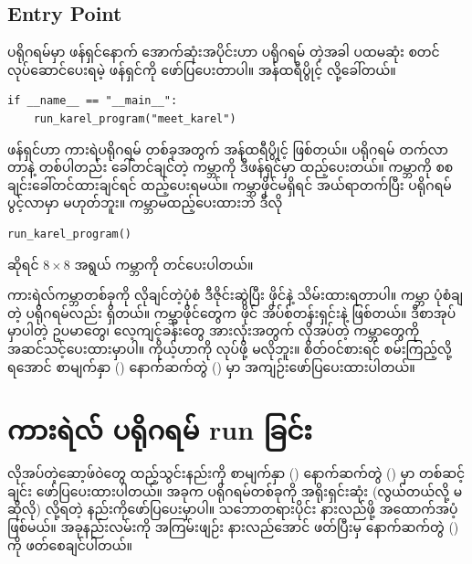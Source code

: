 \subsection*{Entry Point}
 ပရိုဂရမ်မှာ  ဖန်ရှင်နောက် အောက်ဆုံးအပိုင်းဟာ ပရိုဂရမ်  တဲ့အခါ ပထမဆုံး စတင်လုပ်ဆောင်ပေးရမဲ့ ဖန်ရှင်ကို ဖော်ပြပေးတာပါ။ အန်ထရီပွိုင့်  လို့ခေါ်တယ်။ 
%
\setlength{\fboxsep}{0pt}
\begin{verbatim}
if __name__ == "__main__":
    run_karel_program("meet_karel")
\end{verbatim}
%
 ဖန်ရှင်ဟာ ကားရဲပရိုဂရမ် တစ်ခုအတွက် အန်ထရီပွိုင့် ဖြစ်တယ်။  ပရိုဂရမ် တက်လာတာနဲ့ တစ်ပါတည်း ခေါ်တင်ချင်တဲ့ ကမ္ဘာကို ဒီဖန်ရှင်မှာ ထည့်ပေးတယ်။  ကမ္ဘာကို စစချင်းခေါ်တင်ထားချင်ရင်  ထည့်ပေးရမယ်။  ကမ္ဘာဖိုင်မရှိရင် အယ်ရာတက်ပြီး ပရိုဂရမ်ပွင့်လာမှာ မဟုတ်ဘူး။ ကမ္ဘာမထည့်ပေးထားဘဲ ဒီလို
%
\setlength{\fboxsep}{0pt}
\begin{verbatim}
run_karel_program()
\end{verbatim}
%
ဆိုရင် $8 \times 8$ အရွယ်  ကမ္ဘာကို တင်ပေးပါတယ်။

ကားရဲလ်ကမ္ဘာတစ်ခုကို လိုချင်တဲ့ပုံစံ ဒီဇိုင်းဆွဲပြီး ဖိုင်နဲ့ သိမ်းထားရတာပါ။ ကမ္ဘာ ပုံစံချတဲ့ ပရိုဂရမ်လည်း ရှိတယ်။ ကမ္ဘာဖိုင်တွေက  ဖိုင် အိပ်စ်တန်းရှင်းနဲ့ ဖြစ်တယ်။ ဒီစာအုပ်မှာပါတဲ့ ဥပမာတွေ၊ လေ့ကျင့်ခန်းတွေ အားလုံးအတွက် လိုအပ်တဲ့ ကမ္ဘာတွေကို အဆင်သင့်ပေးထားမှာပါ။ ကိုယ့်ဟာကို လုပ်ဖို့ မလိုဘူး။ စိတ်ဝင်စားရင် စမ်းကြည့်လို့ရအောင် စာမျက်နှာ (\fRefNo{\pageref{apdx:02}}) နောက်ဆက်တွဲ (\fRefNo{\ref{apdx:02}}) မှာ အကျဉ်းဖော်ပြပေးထားပါတယ်။

\section{ကားရဲလ် ပရိုဂရမ် run ခြင်း}

လိုအပ်တဲ့ဆော့ဖ်ဝဲတွေ ထည့်သွင်းနည်းကို စာမျက်နှာ (\fRefNo{\pageref{apdx:01}}) နောက်ဆက်တွဲ (\fRefNo{\ref{apdx:01}}) မှာ တစ်ဆင့်ချင်း ဖော်ပြပေးထားပါတယ်။ အခုက  ပရိုဂရမ်တစ်ခုကို အရိုးရှင်းဆုံး (လွယ်တယ်လို့ မဆိုလို)   လို့ရတဲ့ နည်းကိုဖော်ပြပေးမှာပါ။ သဘောတရားပိုင်း နားလည်ဖို့ အထောက်အပံ့ဖြစ်မယ်။ အခုနည်းလမ်းကို အကြမ်းဖျဉ်း နားလည်အောင် ဖတ်ပြီးမှ နောက်ဆက်တွဲ (\fRefNo{\ref{apdx:01}}) ကို ဖတ်စေချင်ပါတယ်။

